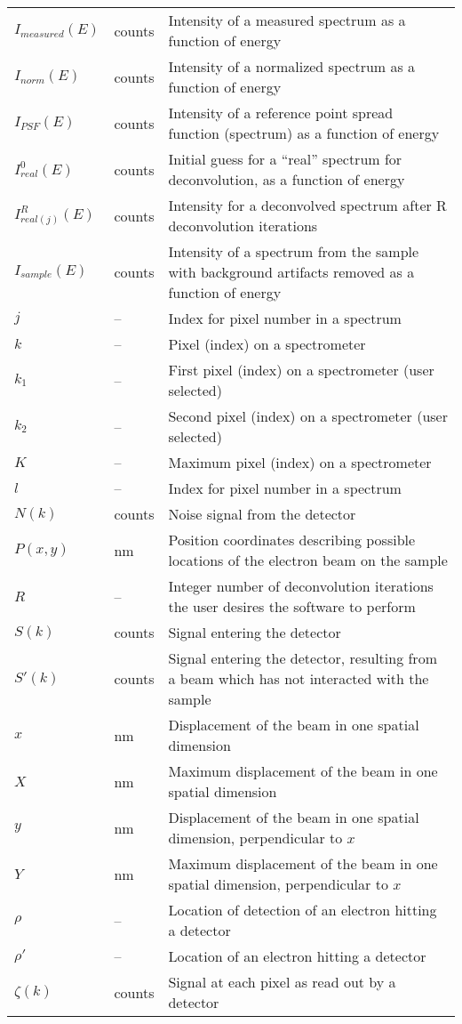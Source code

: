 \documentclass[12pt]{article}
\begin{document}
\begin{longtable*}{l l p{12cm}}
$I_{measured}(E)$ & counts & Intensity of a measured spectrum as a function of energy\\
$I_{norm}(E)$ & counts & Intensity of a normalized spectrum as a function of energy\\
$I_{PSF}(E)$ & counts & Intensity of a reference point spread function (spectrum) as a function of energy\\
$I_{real}^0(E)$ & counts & Initial guess for a ``real'' spectrum for deconvolution, as a function of energy\\
$I_{real (j)}^R(E)$ & counts & Intensity for a deconvolved spectrum after R deconvolution iterations\\
$I_{sample}(E)$ & counts & Intensity of a spectrum from the sample with background artifacts removed as a function of energy\\
$j$ & -- & Index for pixel number in a spectrum\\
$k$ & -- & Pixel (index) on a spectrometer\\
$k_1$ & -- & First pixel (index) on a spectrometer (user selected)\\
$k_2$ & -- & Second pixel (index) on a spectrometer (user selected)\\
$K$ & -- & Maximum pixel (index) on a spectrometer\\
$l$ & -- & Index for pixel number in a spectrum\\
$N(k)$ & counts & Noise signal from the detector\\
$P(x,y)$ & \si{\nano\metre} & Position coordinates describing possible locations of the electron beam on the sample\\
$R$ & -- & Integer number of deconvolution iterations the user desires the software to perform\\
$S(k)$ & counts & Signal entering the detector\\
$S'(k)$ & counts & Signal entering the detector, resulting from a beam which has not interacted with the sample\\
$x$ & \si{\nano\metre} & Displacement of the beam in one spatial dimension\\
$X$ & \si{\nano\metre} & Maximum displacement of the beam in one spatial dimension\\
$y$ & \si{\nano\metre} & Displacement of the beam in one spatial dimension, perpendicular to $x$\\
$Y$ & \si{\nano\metre} & Maximum displacement of the beam in one spatial dimension, perpendicular to $x$\\
$\rho$ & -- & Location of detection of an electron hitting a detector\\
$\rho'$ & -- & Location of an electron hitting a detector\\
$\zeta(k)$ & counts & Signal at each pixel as read out by a detector\\
\bottomrule
\end{longtable*}
\end{document}
